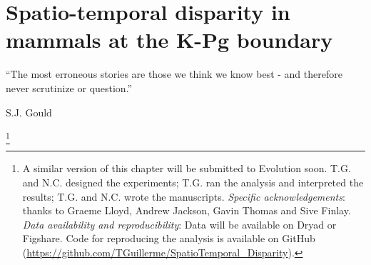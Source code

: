 

%
%

\chapter[Spatio-temporal disparity in mammals at the K-Pg boundary]{Spatio-temporal disparity in mammals at the K-Pg boundary}
\label{chap:STD_paper}

\bigskip
\begin{center}

\begin{quoteshrink}
  ``The most erroneous stories are those we think we know best - and therefore never scrutinize or question.''

\hfill{S.J. Gould}

\end{quoteshrink}
\bigskip

\footnote{A similar version of this chapter will be submitted to Evolution soon. T.G. and N.C. designed the experiments; T.G. ran the analysis and interpreted the results; T.G. and N.C. wrote the manuscripts. \textit{Specific acknowledgements}: thanks to Graeme Lloyd, Andrew Jackson, Gavin Thomas and Sive Finlay. \textit{Data availability and reproducibility}: Data will be available on Dryad or Figshare. Code for reproducing the analysis is available on GitHub (\url{https://github.com/TGuillerme/SpatioTemporal_Disparity}).} \\

\end{center}
%
%
